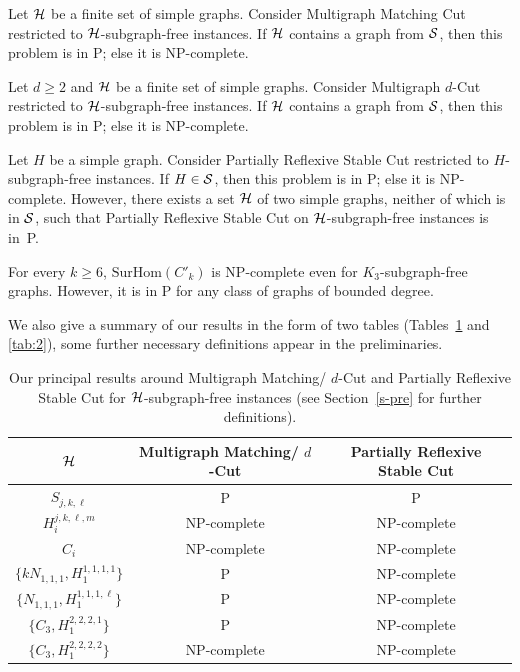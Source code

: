 \documentclass[a4paper,UKenglish,cleveref, autoref,thm-restate]{lipics-v2021}
\newcommand{\SurHom}{\ensuremath{\mathrm{SurHom}}}
\begin{document}
\begin{theorem}\label{t-1}
    Let ${\cal H}$ be a finite set of simple graphs. Consider {\sc Multigraph Matching Cut} restricted to ${\cal H}$-subgraph-free instances. If ${\cal H}$ contains a graph from ${\cal S}$, then this problem is in P; else it is NP-complete.
    \label{thm:matching-main}
\end{theorem}

\begin{theorem}\label{t-2}
    Let $d\geq 2$ and ${\cal H}$ be a finite set of simple graphs. Consider {\sc Multigraph $d$-Cut} restricted to ${\cal H}$-subgraph-free instances. If ${\cal H}$ contains a graph from ${\cal S}$, then this problem is in P; else it is NP-complete.
    \label{thm:d-main}
\end{theorem}

\begin{theorem}\label{t-3}
    Let $H$ be a simple graph. Consider {\sc Partially Reflexive Stable Cut} restricted to $H$-subgraph-free instances. If $H \in {\cal S}$, then this problem is in P; else it is NP-complete. However, there exists a set ${\cal H}$ of two simple graphs, neither of which is in ${\cal S}$, such that  {\sc Partially Reflexive Stable Cut} on ${\cal H}$-subgraph-free instances is in~P. 
    \label{thm:stable-main}
\end{theorem}

\begin{theorem}\label{t-4}
For every $k\geq 6$, $\SurHom(C'_k)$ is NP-complete even for $K_{3}$-subgraph-free graphs. However, it is in P for any class of graphs of bounded degree.
\end{theorem}

We also give a summary of our results in the form of two tables (Tables~\ref{tab:1} and \ref{tab:2}), some further necessary definitions appear in the preliminaries.
\begin{table}
\begin{center}
\begin{tabular}{|c|c|c|}
\hline
 ${\cal H}$ & {\sc Multigraph Matching/ $d$-Cut} & {\sc Partially Reflexive Stable Cut} \\
\hline  
 $S_{j,k,\ell}$ & P & P \\  
\hline
 $H_i^{j,k,\ell,m}$ & NP-complete & NP-complete \\    
\hline
 $C_i$ & NP-complete & NP-complete \\    
\hline
 $\{kN_{1,1,1},H_1^{1,1,1,1}\}$ & P & NP-complete \\
\hline
 $\{N_{1,1,1},H_1^{1,1,1,\ell}\}$ & P & NP-complete \\
\hline
 $\{C_3,H_1^{2,2,2,1}\}$ & P & NP-complete \\ 
\hline
 $\{C_3,H_1^{2,2,2,2}\}$ & NP-complete & NP-complete \\ 
\hline
\end{tabular}
\end{center}
\caption{Our principal results around {\sc Multigraph Matching/ $d$-Cut} and {\sc Partially Reflexive Stable Cut} for ${\cal H}$-subgraph-free instances (see Section~\ref{s-pre} for further definitions).}
\label{tab:1}
\end{table}
\end{document}
